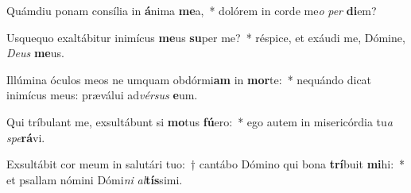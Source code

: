 \item Quámdiu ponam consília in \textbf{á}nima \textbf{me}a,~* dolórem in corde me\textit{o} \textit{per} \textbf{di}em?
\item Usquequo exaltábitur inimícus \textbf{me}us \textbf{su}per me?~* réspice, et exáudi me, Dómine, \textit{De}\textit{us} \textbf{me}us.
\item Illúmina óculos meos ne umquam obdórmi\textbf{am} in \textbf{mor}te:~* nequándo dicat inimícus meus: præválui ad\textit{vér}\textit{sus} \textbf{e}um.
\item Qui tríbulant me, exsultábunt si \textbf{mo}tus \textbf{fú}ero:~* ego autem in misericórdia tu\textit{a} \textit{spe}\textbf{rá}vi.
\item Exsultábit cor meum in salutári tuo:~† cantábo Dómino qui bona \textbf{trí}buit \textbf{mi}hi:~* et psallam nómini Dómi\textit{ni} \textit{al}\textbf{tís}simi.
